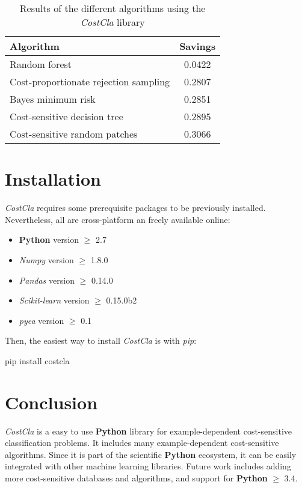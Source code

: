 \begin{table}[htbp]
    \centering
    \footnotesize
    \begin{tabular}{l|c}
      Algorithm & Savings \\
      \hline
      Random forest & 0.0422 \\
      Cost-proportionate rejection sampling & 0.2807\\
      Bayes minimum risk & 0.2851\\
      Cost-sensitive decision tree & 0.2895\\
      Cost-sensitive random patches & 0.3066\\   
    \end{tabular}
    \caption{Results of the different algorithms using the \textit{CostCla} library}
    \label{tab:9:1}
  \end{table}  

\section{Installation}

\textit{CostCla} requires some prerequisite packages to be previously installed. Nevertheless, all 
are cross-platform an freely available online:
\begin{itemize}
 \item \textbf{Python} version $\ge$ 2.7
 \item \textit{Numpy} version $\ge$ 1.8.0
 \item \textit{Pandas} version $\ge$ 0.14.0
 \item \textit{Scikit-learn} version $\ge$ 0.15.0b2
 \item \textit{pyea} version $\ge$ 0.1
\end{itemize}

\noindent Then, the easiest way to install \textit{CostCla}  is with \textit{pip}:
\vskip0.3cm
\begin{pythoncode}
pip install costcla
\end{pythoncode}

\section{Conclusion}
\textit{CostCla} is a easy to use \textbf{Python} library for example-dependent cost-sensitive 
classification problems. It includes many example-dependent cost-sensitive algorithms. Since 
it is part of the scientific \textbf{Python} ecosystem, it can be easily integrated with other 
machine learning libraries. Future work includes adding more cost-sensitive databases and 
algorithms, and support for \textbf{Python} $\ge$ 3.4. 
